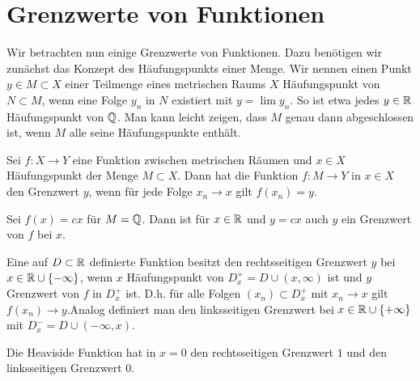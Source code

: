 \section{Grenzwerte von Funktionen}
\label{\detokenize{stetigkeit/grenzwerte:grenzwerte-von-funktionen}}\label{\detokenize{stetigkeit/grenzwerte::doc}}
Wir betrachten nun einige Grenzwerte von Funktionen. Dazu benötigen wir zunächst das Konzept des Häufungspunkts einer Menge. Wir nennen einen Punkt  \(y \in M \subset X\) einer Teilmenge eines metrischen Raums \(X\) Häufungspunkt von \(N \subset M\), wenn eine Folge \(y_n\) in \(N\) existiert mit \(y= \lim y_n\). So ist etwa jedes \(y \in \mathbb{R}\) Häufungspunkt von \(\mathbb{Q}\). Man kann leicht zeigen, dass \(M\) genau dann abgeschlossen ist, wenn \(M\) alle seine Häufungspunkte enthält.
\label{stetigkeit/grenzwerte:definition-0}
\begin{definition}{}{}



Sei \(f: X \rightarrow Y\) eine Funktion zwischen metrischen Räumen und \(x \in X\) Häufungspunkt der Menge \(M \subset X\). Dann hat die Funktion \(f: M \rightarrow Y\) in \(x \in X\) den Grenzwert \(y\), wenn für jede Folge \(x_n \rightarrow x\) gilt \(f(x_n) = y\).
\end{definition}
\label{stetigkeit/grenzwerte:example-1}
\begin{example}{}{}



Sei \(f(x) =cx\) für \(M = \mathbb{Q}\). Dann ist für \(x \in \mathbb{R}\) und \(y=cx\) auch \(y\) ein Grenzwert von \(f\) bei \(x\).
\end{example}
\label{stetigkeit/grenzwerte:definition-2}
\begin{definition}{}{}



Eine auf \(D \subset \mathbb{R}\) definierte Funktion besitzt den rechtsseitigen Grenzwert \(y\) bei \(x \in \mathbb{R} \cup \{-\infty\}\), wenn \(x\)  Häufungspunkt von \(D_x^+=D \cup (x,\infty)\) ist und \(y\) Grenzwert von \(f\) in \(D_x^+\) ist. D.h. für alle Folgen \((x_n) \subset D_x^+\) mit \(x_n \rightarrow x\) gilt \(f(x_n) \rightarrow y\).Analog definiert man den linksseitigen Grenzwert bei \(x \in \mathbb{R} \cup \{+\infty\}\) mit \(D_x^-=D \cup (-\infty,x)\).
\end{definition}
\label{stetigkeit/grenzwerte:example-3}
\begin{example}{}{}



Die Heaviside Funktion hat in \(x=0\) den rechtsseitigen Grenzwert \(1\) und den linksseitigen Grenzwert \(0\).
\end{example}

